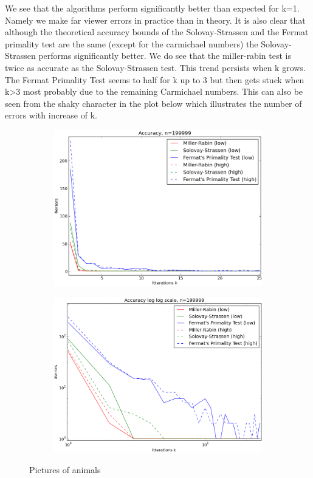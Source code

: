\documentclass[compressed,final,notitlepage,narroweqnarray,inline,twoside,]{ieee}
\begin{document}
We see that the algorithms perform significantly better than expected for k=1. Namely we make far viewer errors in practice than in theory. It is also clear that although the theoretical accuracy bounds of the Solovay-Strassen and the Fermat primality test are the same (except for the carmichael numbers) the Solovay-Strassen performs significantly better. We do see that the miller-rabin test is twice as accurate as the Solovay-Strassen test. This trend persists when k grows. The Fermat Primality Test  seems to half for k up to 3 but then gets stuck when k>3 most probably due to the remaining Carmichael numbers. This can also be seen from the shaky character in the plot below which illustrates the number of errors with increase of k.
\begin{figure}[H]
        \centering
        \begin{subfigure}[b]{0.45\textwidth}
                \includegraphics[width=\textwidth]{../images/Accuracy_all_exp}
                \label{fig:gull}
        \end{subfigure}
        \begin{subfigure}[b]{0.45\textwidth}
                \includegraphics[width=\textwidth]{../images/Accuracy_all}
                \label{fig:tiger}
        \end{subfigure}
 
        \caption{Pictures of animals}\label{fig:animals}
\end{figure}
\end{document}
